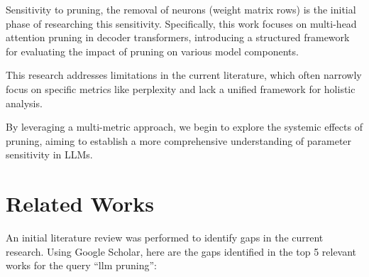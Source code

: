 \documentclass[conference]{IEEEtran}
\begin{document}
    Sensitivity to pruning, the removal of neurons (weight matrix rows) is the initial phase of researching this sensitivity.
    Specifically, this work focuses on multi-head attention pruning in decoder transformers, introducing a structured framework for evaluating the impact of pruning on various model components.

    This research addresses limitations in the current literature, which often narrowly focus on specific metrics like perplexity and lack a unified framework for holistic analysis.

    By leveraging a multi-metric approach, we begin to explore the systemic effects of pruning, aiming to establish a more comprehensive understanding of parameter sensitivity in LLMs.

    \section{Related Works}

    An initial literature review was performed to identify gaps in the current research.
    Using Google Scholar\cite{googlescholar}, here are the gaps identified in the top 5 relevant works for the query ``llm pruning'':
\end{document}
